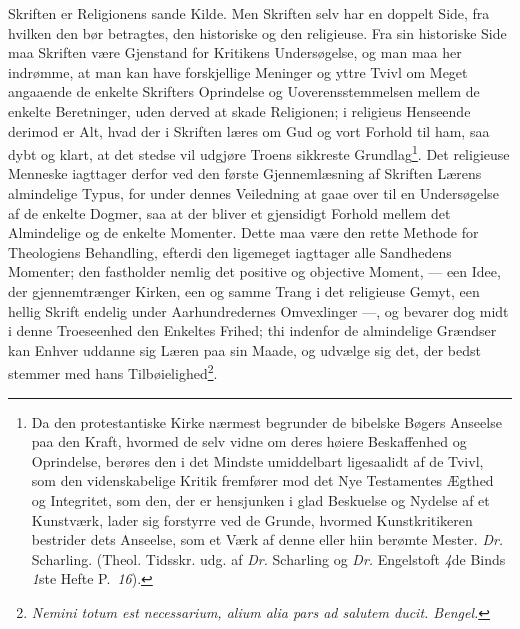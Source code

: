 \documentclass[12pt]{book}
\newcommand{\opage}[1]{\marginnote{\footnotesize\textit{[#1]}}}
\begin{document}
Skriften er Religionens sande Kilde. Men Skriften selv har en doppelt Side,
fra hvilken den bør betragtes, den historiske og den religieuse. Fra sin
historiske Side
\opage{101} \setcounter{footnote}{0}%
maa Skriften være Gjenstand for Kritikens Undersøgelse, og man maa her
indrømme, at man kan have forskjellige Meninger og yttre Tvivl om Meget
angaaende de enkelte Skrifters Oprindelse og Uoverensstemmelsen mellem de
enkelte Beretninger, uden derved at skade Religionen; i religieus Henseende
derimod er Alt, hvad der i Skriften læres om Gud og vort Forhold til ham, saa
dybt og klart, at det stedse vil udgjøre Troens sikkreste
Grundlag\footnote{Da den protestantiske Kirke nærmest begrunder de bibelske
Bøgers Anseelse paa den Kraft, hvormed de selv vidne om deres høiere
Beskaffenhed og Oprindelse, berøres den i det Mindste umiddelbart ligesaalidt
af de Tvivl, som den videnskabelige Kritik fremfører mod det Nye Testamentes
Ægthed og Integritet, som den, der er hensjunken i glad Beskuelse og Nydelse
af et Kunstværk, lader sig forstyrre ved de Grunde, hvormed Kunstkritikeren
bestrider dets Anseelse, som et Værk af denne eller hiin berømte Mester.
\textit{Dr.} Scharling. (Theol. Tidsskr. udg. af \textit{Dr.} Scharling og
\textit{Dr.} Engelstoft \textit{4}de Binds \textit{1}ste Hefte
P.~\textit{16}).}. Det religieuse Menneske iagttager derfor ved den første
Gjennemlæsning af Skriften Lærens almindelige Typus, for under dennes
Veiledning at gaae over til en Undersøgelse af de enkelte Dogmer, saa at der
bliver et gjensidigt Forhold mellem det Almindelige og de enkelte Momenter.
Dette maa være den rette Methode for Theologiens Behandling, efterdi den
ligemeget iagttager alle Sandhedens Momenter; den fastholder nemlig det
positive og objective Moment, --- een Idee, der gjennemtrænger Kirken, een og
samme Trang i det religieuse Gemyt, een hellig Skrift endelig under
Aarhundredernes Omvexlinger ---, og bevarer dog midt i denne Troeseenhed den
Enkeltes Frihed; thi indenfor de almindelige Grændser kan Enhver uddanne sig
Læren paa sin Maade, og udvælge sig det, der bedst stemmer med hans
Tilbøielighed\footnote{\textit{Nemini totum est necessarium, alium alia pars
ad salutem ducit. Bengel.}}.
\end{document}
